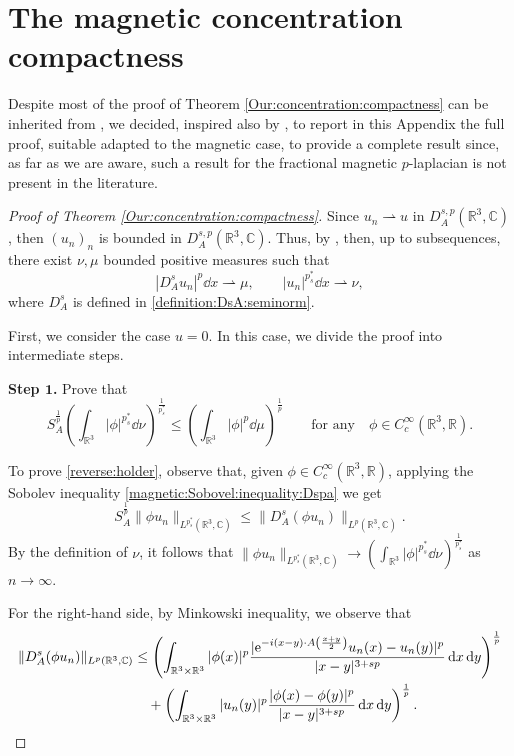 \documentclass[leqno,11pt]{amsart}
\newcommand{\R}{\mathbb R}
\newcommand{\C}{\mathbb C}
\numberwithin{equation}{section}
\def\e{{\rm e}}
\newcommand{\expAminus}{\e^{-i(x-y)\cdot A\left(\frac{x+y}{2}\right)}}
\begin{document}
\appendix

\section{The magnetic concentration compactness}
\label{Appendix}
Despite most of the proof of Theorem \ref{Our:concentration:compactness} can be inherited from \cite[Theorem 1.1]{BonderSaintierSilva}, we decided, inspired also by \cite{ArioliSzulkin2003}, to report in this Appendix the full proof, suitable adapted to the magnetic case, to provide a complete result since, as far as we are aware, such a result for the fractional magnetic $p$-laplacian is not present in the literature.


\begin{proof}[Proof of Theorem \ref{Our:concentration:compactness}]
Since $u_n\rightharpoonup u$ in $D^{s,p}_A(\R^3,\C)$, then $(u_n)_n$ is bounded in $D^{s,p}_A(\R^3,\C)$. Thus, by \cite[Proposition 1.202]{FonsecaLeoni}, then, up to subsequences, there exist $\nu,\mu$ bounded positive measures such that 
$$
    |D^s_A u_n|^p\dd x\rightharpoonup \mu,\qquad |u_n|^{p^*_s}\dd x\rightharpoonup \nu,
$$
where $D^s_A$ is defined in \eqref{definition:DsA:seminorm}.


First, we consider the case $u=0$. In this case, we divide the proof into intermediate steps.

{\bf Step $\mathbf{1}$.} Prove that
\begin{equation}\label{reverse:holder}
    S_A^\frac{1}{p}\left(\int_{\R^3} |\phi|^{p^*_s}\dd\nu\right)^\frac{1}{p^*_s} \le \left(\int_{\R^3} |\phi|^p\dd\mu\right)^\frac{1}{p}\qquad \text{for any}\quad  \phi\in C^\infty_c(\R^3,\R).
\end{equation}


To prove \eqref{reverse:holder}, observe that, given $\phi\in C^\infty_c(\R^3,\R)$, applying the Sobolev inequality
\eqref{magnetic:Sobovel:inequality:Dspa} we get
$$
    S_A^\frac{1}{p} \|\phi u_n\|_{L^{p^*_s}(\R^3,\C)}\le \| D^s_A(\phi u_n)\|_{L^p(\R^3,\C)}.
$$
By the definition of $\nu$, it follows that $\|\phi u_n\|_{L^{p^*_s}(\R^3,\C)}\to \left(\int_{\R^3} |\phi|^{p^*_s}\dd\nu\right)^\frac{1}{p^*_s}$ as  $n\to\infty$.

For the right-hand side, by Minkowski inequality, we observe that
\begin{align*}
    \|D^s_A(\phi u_n)\|_{L^p(\R^3,\C)} &\le \left(\int_{\R^3\times\R^3}|\phi(x)|^p\frac{|\expAminus u_n(x)-u_n(y)|^p}{|x-y|^{3+sp}}\dd x\dd y\right)^{\frac1p}\\
    &\quad+\left(\int_{\R^3\times\R^3}|u_n(y)|^p\frac{|\phi(x)-\phi(y)|^p}{|x-y|^{3+sp}}\dd x\dd y\right)^{\frac1p}.
\end{align*}



\end{proof}
\end{document}
